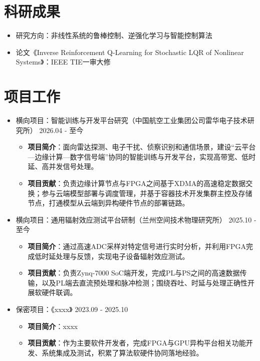 \documentclass{logo-cv}
\begin{document}
\section{科研成果}
\begin{itemize}
    \item 研究方向：非线性系统的鲁棒控制、逆强化学习与智能控制算法
    \item 论文《Inverse Reinforcement Q-Learning for Stochastic LQR of Nonlinear Systems》：IEEE TIE一审大修
\end{itemize}

\section{项目工作}
\begin{itemize}
    \item 横向项目：智能训练与开发平台研究（中国航空工业集团公司雷华电子技术研究所） \hfill 2026.04 - 至今
    \begin{itemize}
        \item \textbf{项目简介}：面向雷达探测、电子干扰、侦察识别和通信场景，建设“云平台—边缘计算—数字信号端”协同的智能训练与开发平台，实现高带宽、低时延、高并发信号处理。
        \item \textbf{项目贡献}：负责边缘计算节点与FPGA之间基于XDMA的高速稳定数据交换；参与云端模型部署与调度管理，并基于容器技术开发集群主控及存储节点，打通模型从云端到异构硬件节点的部署链路。
    \end{itemize}
    \item 横向项目：通用辐射效应测试平台研制（兰州空间技术物理研究所） \hfill 2025.10 - 至今
    \begin{itemize}
        \item \textbf{项目简介}：通过高速ADC采样对特定信号进行实时分析，并利用FPGA完成低时延处理与反馈，实现电子设备辐射效应测试。
        \item \textbf{项目贡献}：负责Zynq-7000 SoC端开发，完成PL与PS之间的高速数据传输，以及PL端去直流预处理和脉冲检测；围绕吞吐、时延与处理正确性开展软硬件联调。
    \end{itemize}
    \item 保密项目：《xxxx》 \hfill 2023.09 - 2025.10
    \begin{itemize}
        \item \textbf{项目简介}：xxxx
        \item \textbf{项目贡献}：作为主要软件开发者，完成FPGA与GPU异构平台相关功能开发、系统集成及测试，积累了算法软硬件协同落地经验。
    \end{itemize}

\end{itemize}
\end{document}
